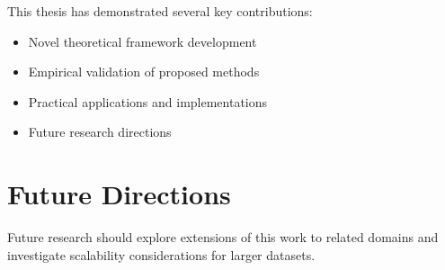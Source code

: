 \documentclass[12pt,cjk]{e_class_thesis}
\begin{document}
This thesis has demonstrated several key contributions:
\begin{itemize}
    \item Novel theoretical framework development
    \item Empirical validation of proposed methods
    \item Practical applications and implementations
    \item Future research directions
\end{itemize}

\section{Future Directions}

Future research should explore extensions of this work to related domains and investigate scalability considerations for larger datasets.

\appendix


\end{document}

